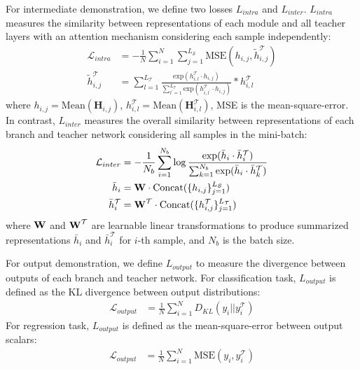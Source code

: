 For intermediate demonstration, we define two losses $L_{intra}$ and $L_{inter}$. $L_{intra}$ measures the similarity between representations of each module and all teacher 
layers with an attention mechanism considering each sample independently:
\begin{align}
    \mathcal{L}_{intra}&=-\frac{1}{N}\sum_{i=1}^N\sum_{j=1}^{L_{\mathcal{S}}}\text{MSE}(h_{i,j},\tilde{h}^{\mathcal{T}}_{i,j}) \\
    \tilde{h}^{\mathcal{T}}_{i,j}&=\sum_{l=1}^{L_{\mathcal{T}}}\frac{\text{exp}(h_{i,l}^{\mathcal{T}}\cdot h_{i,j})}{\sum_{l^\prime =1}^{L_{\mathcal{T}}}\text{exp}(h_{i,l^\prime}^{\mathcal{T}}\cdot h_{i,j})}*h_{i,l}^{\mathcal{T}}
\end{align}
where $h_{i,j}=\text{Mean}(\bm{H}_{i,j})$, $h_{i,l}^{\mathcal{T}}=\text{Mean}(\bm{H}_{i,l}^{\mathcal{T}})$, MSE is the mean-square-error. In contrast, $L_{inter}$ measures the overall similarity between representations of 
each branch and teacher network considering all samples in the mini-batch:
\begin{align}
   \mathcal{L}_{inter}&=-\frac{1}{N_{b}}\sum_{i=1}^{N_b}\log{\frac{\text{exp}(\bar{h}_i\cdot \bar{h}^{\mathcal{T}}_i)}{\sum_{k=1}^{N_b}\text{exp}(\bar{h}_i\cdot \bar{h}_{k}^{\mathcal{T}})}} \\
   \bar{h}_i&=\text{\textbf{W}}\cdot \text{Concat}(\{h_{i,j}\}_{j=1}^{L_{\mathcal{S}}}) \\
   \bar{h}_i^{\mathcal{T}}&=\text{\textbf{W}}^{\mathcal{T}}\cdot \text{Concat}(\{h_{i,j}^{\mathcal{T}}\}_{j=1}^{L_{\mathcal{T}}})
\end{align}
where $\text{\textbf{W}}$ and $\text{\textbf{W}}^{\mathcal{T}}$ are learnable linear transformations to produce summarized representations $\bar{h}_i$ and $\bar{h}_i^{\mathcal{T}}$ for $i$-th sample, and $N_b$ is the batch size.

For output demonstration, we define $L_{output}$ to measure the divergence between outputs of each branch and teacher network. For classification task, $L_{output}$ is defined 
as the KL divergence between output distributions:
\begin{align}
    \mathcal{L}_{output}&=\frac{1}{N}\sum_{i=1}^ND_{KL}(y_i||y_i^{\mathcal{T}})
\end{align}
For regression task, $L_{output}$ is defined as the mean-square-error between output scalars:
\begin{align}
    \mathcal{L}_{output}&=\frac{1}{N}\sum_{i=1}^N\text{MSE}(y_i, y_i^{\mathcal{T}})
\end{align}

